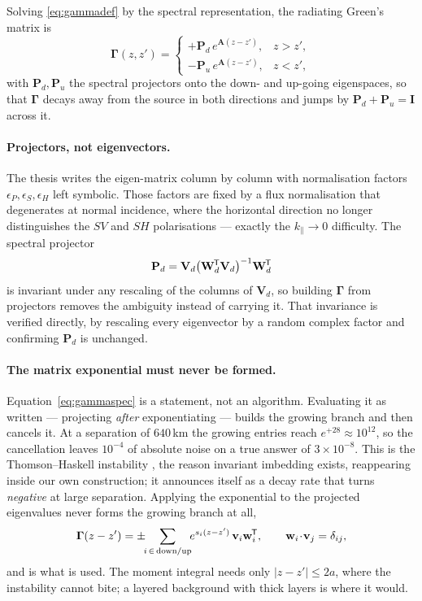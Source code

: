 \documentclass[11pt,a4paper]{article}
\newcommand{\bI}{\mathbf{I}}
\newcommand{\bA}{\mathbf{A}}
\newcommand{\bW}{\mathbf{W}}
\newcommand{\bV}{\mathbf{V}}
\newcommand{\bP}{\mathbf{P}}
\newcommand{\tp}{^{\mkern-1.5mu\mathsf{T}}}
\begin{document}
Solving \eqref{eq:gammadef} by the spectral representation, the radiating
Green's matrix is
\begin{equation}\label{eq:gammaspec}
  \boldsymbol\Gamma(z,z') =
  \begin{cases}
    +\bP_d\,e^{\bA(z-z')}, & z > z',\\[2pt]
    -\bP_u\,e^{\bA(z-z')}, & z < z',
  \end{cases}
\end{equation}
with $\bP_d,\bP_u$ the spectral projectors onto the down- and up-going
eigenspaces, so that $\boldsymbol\Gamma$ decays away from the source in both
directions and jumps by $\bP_d + \bP_u = \bI$ across it.

\paragraph{Projectors, not eigenvectors.}  The thesis writes the eigen-matrix
column by column with normalisation factors $\epsilon_P,\epsilon_S,\epsilon_H$
left symbolic.  Those factors are fixed by a flux normalisation that degenerates
at normal incidence, where the horizontal direction no longer distinguishes the
$SV$ and $SH$ polarisations --- exactly the $k_\parallel\to0$ difficulty.  The
spectral projector
\begin{equation}\label{eq:projector}
  \bP_d = \bV_d\bigl(\bW_d\tp\bV_d\bigr)^{-1}\bW_d\tp
\end{equation}
is invariant under any rescaling of the columns of $\bV_d$, so building
$\boldsymbol\Gamma$ from projectors removes the ambiguity instead of carrying
it.  That invariance is verified directly, by rescaling every eigenvector by a
random complex factor and confirming $\bP_d$ is unchanged.

\paragraph{The matrix exponential must never be formed.}
Equation~\eqref{eq:gammaspec} is a statement, not an algorithm.  Evaluating it as
written --- projecting \emph{after} exponentiating --- builds the growing branch
and then cancels it.  At a separation of $640$\,km the growing entries reach
$e^{+28}\approx10^{12}$, so the cancellation leaves $10^{-4}$ of absolute noise
on a true answer of $3\times10^{-8}$.  This is the Thomson--Haskell instability \cite{thomson1950,haskell1953},
the reason invariant imbedding exists, reappearing inside our own construction;
it announces itself as a decay rate that turns \emph{negative} at large
separation.  Applying the exponential to the projected eigenvalues never forms
the growing branch at all,
\begin{equation}\label{eq:gammastable}
  \boldsymbol\Gamma(z-z') = \pm\!\!\sum_{i\,\in\,\text{down/up}}\!\!
    e^{s_i(z-z')}\,\mathbf{v}_i\mathbf{w}_i\tp,
  \qquad \mathbf{w}_i\!\cdot\!\mathbf{v}_j = \delta_{ij},
\end{equation}
and is what is used.  The moment integral needs only $|z-z'|\le 2a$, where the
instability cannot bite; a layered background with thick layers is where it
would.
\end{document}

